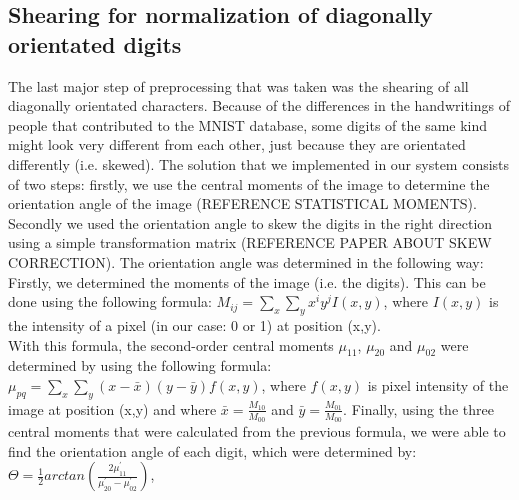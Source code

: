 \documentclass[11pt,twoside,a4paper]{article}
\begin{document}
\subsection{Shearing for normalization of diagonally orientated digits}
The last major step of preprocessing that was taken was the shearing of all diagonally orientated characters. Because of the differences in the handwritings of people that contributed to the MNIST database, some digits of the same kind might look very different from each other, just because they are orientated differently (i.e. skewed). The solution that we implemented in our system consists of two steps: firstly, we use the central moments of the image to determine the orientation angle of the image (REFERENCE STATISTICAL MOMENTS). Secondly we used the orientation angle to skew the digits in the right direction using a simple transformation matrix (REFERENCE PAPER ABOUT SKEW CORRECTION). The orientation angle was determined in the following way:\\
Firstly, we determined the moments of the image (i.e. the digits). This can be done using the following formula:\newline
\newline
$M_{ij} = \sum_{x}^{} \sum_{y}^{} x^{i}y^{j}I(x,y)$,
\newline\newline
where $I(x,y)$ is the intensity of a pixel (in our case: 0 or 1) at position (x,y).\\
With this formula, the second-order central moments $\mu_{11}$, $\mu_{20}$ and $\mu_{02}$ were determined by using the following formula:
\newline\newline
$\mu_{pq} = \sum_{x}^{} \sum_{y}^{}(x-\bar{x})(y-\bar{y})f(x,y)$,
\newline\newline
where $f(x,y)$ is pixel intensity of the image at position (x,y) and where $\bar{x} = \frac{M_{10}}{M_{00}}$ and $\bar{y} = \frac{M_{01}}{M_{00}}$.\newline\newline
Finally, using the three central moments that were calculated from the previous formula, we were able to find the orientation angle of each digit, which were determined by:
\newline\newline
$\Theta = \frac{1}{2} arctan(\frac{2\mu_{11}^{'}}{\mu_{20}^{'} - \mu_{02}^{'}})$,
\newline\newline
\end{document}
